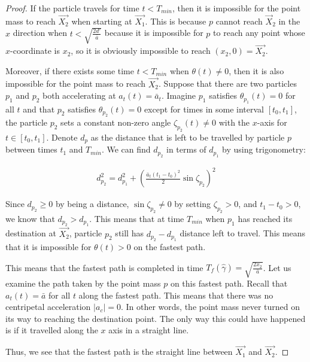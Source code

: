 \begin{proof}
If the particle travels for time $t < T_{min}$, then it is impossible for the point mass to reach $\vec{X_2}$ when starting at $\vec{X_1}$. This is because $p$ cannot reach $\vec{X}_2$ in the $x$ direction when $t < \sqrt{\frac{2 d'}{\bar{a}}}$ because it is impossible for $p$ to reach any point whose $x$-coordinate is $x_2$, so it is obviously impossible to reach $(x_2, 0) = \vec{X_2}$.

Moreover, if there exists some time $t < T_{min}$ when $\theta(t) \neq 0$, then it is also impossible for the point mass to reach $\vec{X_2}$. Suppose that there are two particles $p_1$ and $p_2$ both accelerating at $a_t(t) = \bar{a}_t$. Imagine $p_1$ satisfies $\theta_{p_1}(t) = 0$ for all $t$ and that $p_2$ satisfies $\theta_{p_2}(t) = 0$ except for times in some interval $[t_0, t_1]$, the particle $p_2$ sets a constant non-zero angle $\zeta_{p_2}(t) \neq 0$ with the $x$-axis for $t \in [t_0, t_1]$. Denote $d_{p}$ as the distance that is left to be travelled by particle $p$ between times $t_1$ and $T_{min}$. We can find $d_{p_2}$ in terms of $d_{p_1}$ by using trigonometry:

\begin{eqnarray}
d_{p_2}^2 = d_{p_1}^2 + \left(\frac{\bar{a}_t (t_1 - t_0)^2}{2} \sin \zeta_{p_2} \right)^2
\end{eqnarray}

Since $d_{p_2} \geq 0$ by being a distance, $\sin \zeta_{p_2} \neq 0$ by setting $\zeta_{p_2} > 0$, and $t_1 - t_0 > 0$, we know that $d_{p_2} > d_{p_1}$. This means that at time $T_{min}$ when $p_1$ has reached its destination at $\Vec{X_2}$, particle $p_2$ still has $d_{p_2} - d_{p_1}$ distance left to travel. This means that it is impossible for $\theta(t) > 0$ on the fastest path.

This means that the fastest path is completed in time $T_f(\hat{\gamma}) = \sqrt{\frac{2 x_2}{\bar{a}}}$. Let us examine the path taken by the point mass $p$ on this fastest path. Recall that $a_t(t) = \bar{a}$ for all $t$ along the fastest path. This means that there was no centripetal acceleration $|a_c| = 0$. In other words, the point mass never turned on its way to reaching the destination point. The only way this could have happened is if it travelled along the $x$ axis in a straight line.

Thus, we see that the fastest path is the straight line between $\vec{X_1}$ and $\vec{X_2}$.
\end{proof}

